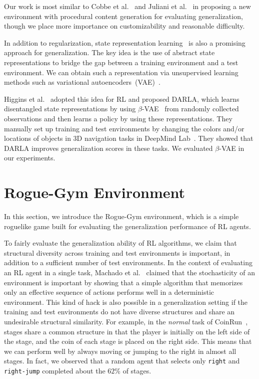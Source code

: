 \documentclass[conference]{IEEEtran}
\newcommand\hig{Higgins et al.~\cite{DARLA}}
\newcommand\cobbe{Cobbe et al.~\cite{Coinrun}}
\newcommand\juli{Juliani et al.~\cite{ObsTower}}
\newcommand\macha{Machado et al.~\cite{Machado18}}
\newcommand\sco{stochasticity}
\newcommand\bvae{$\beta$-VAE}
\newcommand\pcg{procedural content generation} %
\begin{document}
Our work is most similar to \cobbe{} and \juli{} in proposing a new
environment with \pcg{} for evaluating generalization, though we place
more importance on customizability and reasonable difficulty.

In addition to regularization, state representation
learning~\cite{SRL} is also a promising approach for generalization.
The key idea is the use of abstract state representations to bridge the
gap between a training environment and a test environment. We can
obtain such a representation via unsupervised learning
methods such as variational autoencoders~(VAE)~\cite{KingmaW13}.

\hig{} adopted this idea for RL and proposed DARLA, which learns
disentangled state representations by using \bvae{}~\cite{betaVAE} from
randomly collected observations and then learns a policy by using these
representations. They manually set up training and test environments by
changing the colors and/or locations of objects in 3D navigation tasks in
DeepMind Lab~\cite{DMLab}. They showed that DARLA improves generalization
scores in these tasks.
We evaluated \bvae{} in our experiments. 


\section{Rogue-Gym Environment}\label{section:rogue-gym}
In this section, we introduce the Rogue-Gym environment, which is a
simple roguelike game built for evaluating the generalization performance
of RL agents.

To fairly evaluate the generalization ability of RL algorithms, we claim
that structural diversity across training and test environments is
important, in addition to a sufficient number of test environments.
In the context of evaluating an RL agent in a single task, \macha{}
claimed that the \sco{} of an environment is important by showing that a
simple algorithm that memorizes only an effective sequence of actions
performs well in a deterministic environment.
This kind of hack is also possible in a generalization setting if the
training and test environments do not have diverse structures and share
an undesirable structural similarity.
For example, in the \textit{normal} task of CoinRun~\cite{Coinrun},
stages share a common structure in that the player is initially on the left
side of the stage, and the coin of each stage is placed on the right
side.
This means that we can perform well by always moving or jumping
to the right in almost all stages.
In fact, we observed that a random agent that selects only
\texttt{right} and \texttt{right-jump} completed about the $62$\% of
stages.
\end{document}

